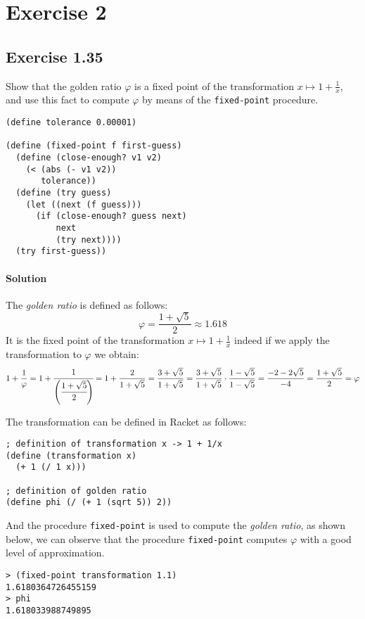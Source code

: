 \section*{Exercise 2}

\subsection*{Exercise 1.35}
Show that the golden ratio $ \varphi $ is a fixed point of the transformation $ x \mapsto 1 + \frac{1}{x} $, and use this fact
to compute $ \varphi $ by means of the \texttt{fixed-point} procedure.

\begin{lstlisting}
(define tolerance 0.00001)

(define (fixed-point f first-guess)
  (define (close-enough? v1 v2)
    (< (abs (- v1 v2))
       tolerance))
  (define (try guess)
    (let ((next (f guess)))
      (if (close-enough? guess next)
          next
          (try next))))
  (try first-guess))
\end{lstlisting}

\paragraph{Solution}
The \textit{golden ratio} is defined as follows: \[ \varphi = \frac{1 + \sqrt{5}}{2} \approx 1.618 \]
It is the fixed point of the transformation $ x \mapsto 1 + \frac{1}{x} $ indeed if we apply the transformation to $ \varphi $
we obtain:
\[ 
    1 + \frac{1}{\varphi} = 1 + \cfrac{1}{\left( \cfrac{1 + \sqrt{5}}{2} \right) } = 1 + \frac{2}{1 + \sqrt{5}} = 
    \frac{3 + \sqrt{5}}{1 + \sqrt{5}} = \frac{3 + \sqrt{5}}{1 + \sqrt{5}} \cdot \frac{1 - \sqrt{5}}{1 - \sqrt{5}} = 
    \frac{-2 - 2\sqrt{5}}{-4} = \frac{1 + \sqrt{5}}{2} = \varphi
\]

The transformation can be defined in Racket as follows:
\begin{lstlisting}
; definition of transformation x -> 1 + 1/x
(define (transformation x)
  (+ 1 (/ 1 x)))

; definition of golden ratio
(define phi (/ (+ 1 (sqrt 5)) 2))
\end{lstlisting}
And the procedure \texttt{fixed-point} is used to compute the \textit{golden ratio}, as shown below, we can observe that the procedure
\texttt{fixed-point} computes $ \varphi $ with a good level of approximation.
\begin{lstlisting}
> (fixed-point transformation 1.1)
1.6180364726455159
> phi
1.618033988749895
\end{lstlisting}

